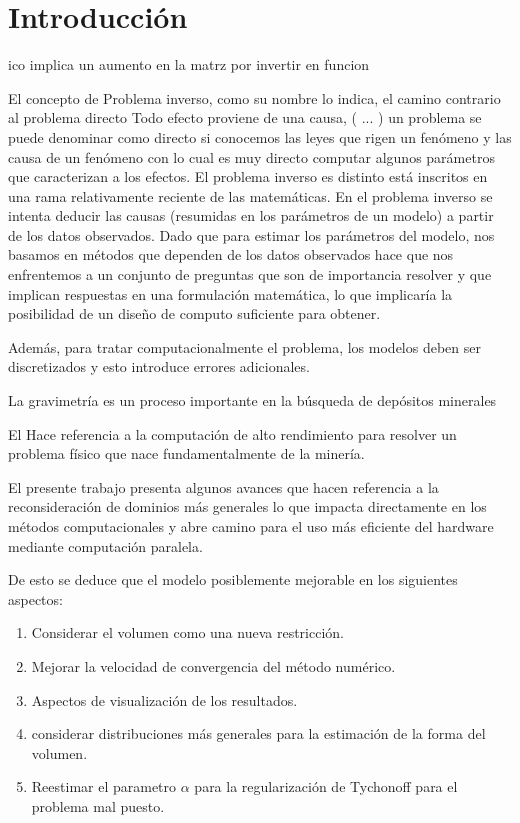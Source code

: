 
\section{Introducción}




ico implica un aumento en la matrz por invertir en funcion


El concepto de Problema inverso, como su nombre lo indica, el camino contrario al problema directo
Todo efecto proviene de una causa, ( ... ) un problema se puede denominar como directo si conocemos las leyes que rigen un fenómeno y las causa de un fenómeno con lo cual es muy directo computar algunos parámetros que caracterizan a los efectos. El problema inverso es distinto está inscritos en una rama relativamente reciente de las matemáticas.  En el problema inverso se intenta deducir las causas (resumidas en los parámetros de un modelo) a partir de los datos observados. Dado que para estimar los parámetros del modelo, nos basamos en métodos que dependen de los datos observados hace que nos enfrentemos a un conjunto de preguntas que son de importancia resolver y que implican respuestas en una formulación matemática, lo que implicaría la posibilidad de un diseño de computo suficiente para obtener.

Además, para tratar computacionalmente el problema, los modelos deben ser discretizados y esto introduce errores adicionales.




La gravimetría es un proceso importante en la búsqueda de depósitos minerales 

El Hace referencia a la computación de alto rendimiento para resolver un
problema físico que nace fundamentalmente de la minería.

El presente trabajo presenta algunos avances que hacen referencia a la
reconsideración de dominios más generales lo que impacta directamente
en los métodos computacionales y abre camino para el uso más eficiente
del hardware mediante computación paralela.

De esto se deduce que el modelo posiblemente mejorable en los siguientes aspectos: 
\begin{enumerate}
\item Considerar el volumen como una nueva restricción.
\item Mejorar la velocidad de convergencia del método numérico.
\item Aspectos de visualización de los resultados.
\item considerar distribuciones más generales para la estimación de la
  forma del volumen.
\item Reestimar el parametro $\alpha$ para la regularización de
  Tychonoff para el problema mal puesto.
\end{enumerate}


